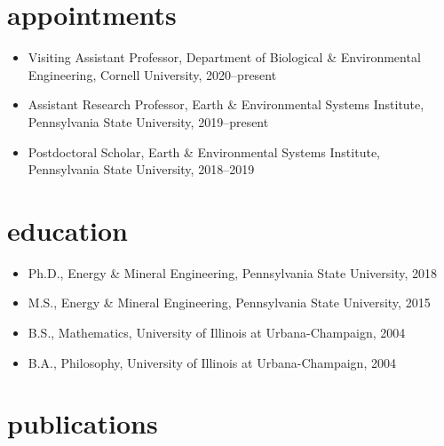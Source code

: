 \documentclass[11pt,article,oneside]{memoir}
\begin{document}

\section{appointments}

\mbox{}\vspace{-\dimexpr\baselineskip\relax}

\begin{itemize}[label={}]

\item Visiting Assistant Professor, Department of Biological \& Environmental Engineering, Cornell University, 2020--present

\item Assistant Research Professor, Earth \& Environmental Systems Institute, Pennsylvania State University, 2019--present

\item Postdoctoral Scholar, Earth \& Environmental Systems Institute, Pennsylvania State University, 2018--2019

\end{itemize}


\section{education}

\mbox{}\vspace{-\dimexpr\baselineskip\relax}

\begin{itemize}[label={}]

\item Ph.D., Energy \& Mineral Engineering, Pennsylvania State University, 2018

\item M.S., Energy \& Mineral Engineering, Pennsylvania State University, 2015

\item B.S., Mathematics, University of Illinois at Urbana-Champaign, 2004

\item B.A., Philosophy, University of Illinois at Urbana-Champaign, 2004

\end{itemize}

\section{publications}
\end{document}
